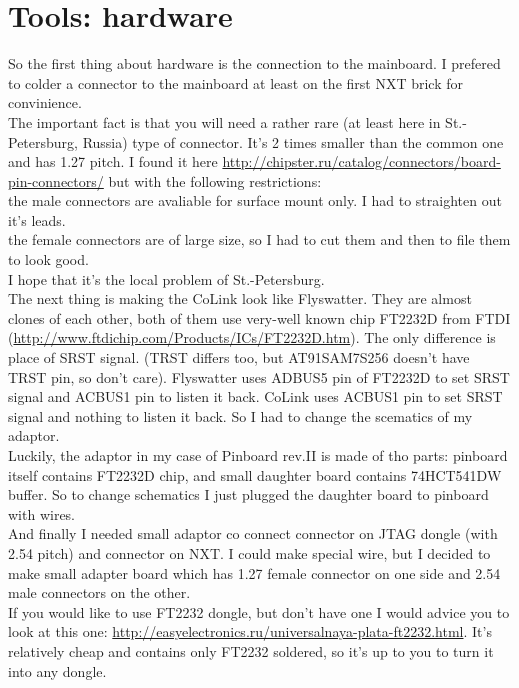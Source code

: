 \documentclass[11pt]{article}
\begin{document}
	\section{Tools: hardware}
		So the first thing about hardware is the connection to the mainboard. I prefered to colder a connector to the mainboard at least on the first NXT brick for convinience.\\
		The important fact is that you will need a rather rare (at least here in St.-Petersburg, Russia) type of connector. It's 2 times smaller than the common one and has 1.27 pitch. I found it here \url{http://chipster.ru/catalog/connectors/board-pin-connectors/} but with the following restrictions:\\
		the male connectors are avaliable for surface mount only. I had to straighten out it's leads.\\
		the female connectors are of large size, so I had to cut them and then to file them to look good.\\
		I hope that it's the local problem of St.-Petersburg.\\
		The next thing is making the CoLink look like Flyswatter. They are almost clones of each other, both of them use very-well known chip FT2232D from FTDI (\url{http://www.ftdichip.com/Products/ICs/FT2232D.htm}\cite{ftdi_chip_2232}). The only difference is place of SRST signal. (TRST differs too, but AT91SAM7S256 doesn't have TRST pin, so don't care). Flyswatter uses ADBUS5 pin of FT2232D to set SRST signal and ACBUS1 pin to listen it back. CoLink uses ACBUS1 pin to set SRST signal and nothing to listen it back. So I had to change the scematics of my adaptor.\\
		Luckily, the adaptor in my case of Pinboard rev.II is made of tho parts: pinboard itself contains FT2232D chip, and small daughter board contains 74HCT541DW buffer. So to change schematics I just plugged the daughter board to pinboard with wires.\\
		And finally I needed small adaptor co connect connector on JTAG dongle (with 2.54 pitch) and connector on NXT. I could make special wire, but I decided to make small adapter board which has 1.27 female connector on one side and 2.54 male connectors on the other.\\
		If you would like to use FT2232 dongle, but don't have one I would advice you to look at this one: \url{http://easyelectronics.ru/universalnaya-plata-ft2232.html}. It's relatively cheap and contains only FT2232 soldered, so it's up to you to turn it into any dongle.
\end{document}
